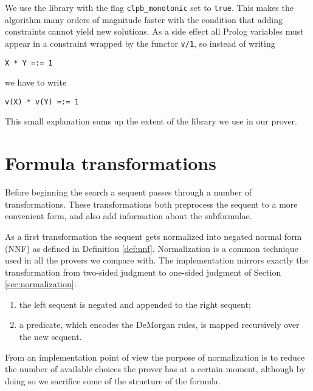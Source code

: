 We use the library with the flag \texttt{clpb\_monotonic} set to \texttt{true}.
This makes the algorithm many orders of magnitude faster with the condition that adding constraints cannot yield new solutions. 
As a side effect all Prolog variables must appear in a constraint wrapped by the functor \texttt{v/1}, so instead of writing
\begin{verbatim}
X * Y =:= 1
\end{verbatim}
we have to write
\begin{verbatim}
v(X) * v(Y) =:= 1
\end{verbatim}
This small explanation sums up the extent of the library we use in our prover.

\section{Formula transformations}
Before beginning the search a sequent passes through a number of transformations.
These transformations both preprocess the sequent to a more convenient form, and also add information about the subformulae.

As a first transformation the sequent gets normalized into negated normal form (NNF) as defined in Definition \ref{def:nnf}.
Normalization is a common technique used in all the provers we compare with.
The implementation mirrors exactly the transformation from two-sided judgment to one-sided judgment of Section \ref{sec:normalization}:
\begin{enumerate}
	\item the left sequent is negated and appended to the right sequent;
	\item a predicate, which encodes the DeMorgan rules, is mapped recursively over the new sequent.
\end{enumerate}
From an implementation point of view the purpose of normalization is to reduce the number of available choices the prover has at a certain moment, although by doing so we sacrifice some of the structure of the formula.

